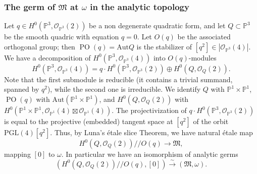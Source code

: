 \documentclass[11pt]{amsart}
\numberwithin{equation}{section}
\theoremstyle{plain}
\theoremstyle{remark}
\theoremstyle{definition}
\newcommand{\Aut}{\mathrm{Aut}}
\newcommand{\PGL}{\mathrm{PGL}}
\newcommand{\gquot}{/\!\!/}
\DeclareMathOperator{\PO}{PO}
\newcommand{\cO}{{\mathscr O}}
\newcommand{\gM}{\mathfrak{M}}
\newcommand{\lra}{\longrightarrow}
\newcommand{\PP}{{\mathbb P}}
\begin{document}
\subsubsection{The germ of $\gM$ at  $\omega$ in the analytic topology}
%
Let $q\in H^0(\PP^3,\cO_{\PP^3}(2))$ be a non degenerate quadratic form, and let  ${Q}\subset\PP^3$ be the smooth quadric with equation $q=0$. Let $O(q)$ be the associated orthogonal group; then $\PO(q)=\Aut {Q}$ is the 
stabilizer of $[q^2]\in |\cO_{\PP^3}(4)|$. We have a decomposition of $H^0(\PP^3,\cO_{\PP^3}(4))$ into $O(q)$-modules 
%
\begin{equation*}
%
H^0(\PP^3,\cO_{\PP^3}(4))=q\cdot H^0(\PP^3,\cO_{\PP^3}(2))\oplus H^0({Q},\cO_{Q}(2)). 
%
\end{equation*}
%
Note that the first submodule is reducible (it contains a trivial summand, spanned by $q^2$), while the second one is  irreducible. We identify ${Q}$ with $\PP^1\times\PP^1$, $\PO(q)$ with $\Aut(\PP^1\times\PP^1)$, and $H^0({Q},\cO_{Q}(2))$ with $H^0(\PP^1\times\PP^1,\cO_{\PP^1}(4)\boxtimes \cO_{\PP^1}(4))$. The projectivization of $q\cdot H^0(\PP^3,\cO_{\PP^3}(2))$ is equal to the projective (embedded) tangent space at $[q^2]$ of the orbit $\PGL(4)[q^2]$.  
Thus, by Luna's \'etale slice Theorem, we have natural \'etale map
%
\begin{equation*}
%
H^0({Q},\cO_{Q}(2))\gquot O(q) \lra \gM,
%
\end{equation*}
%
mapping $[0]$ to $\omega$. In particular we have an isomorphism of analytic germs
%
%
\begin{equation}\label{omgerme}
%
(H^0({Q},\cO_{Q}(2))\gquot O(q),[0]) \overset{\sim}{\lra} (\gM,\omega).
%
\end{equation}
%
%
\end{document}

